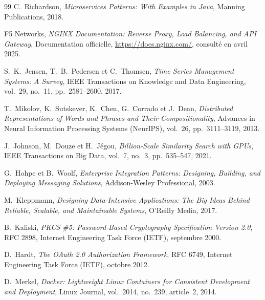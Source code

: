 \begin{thebibliography}{99}
C.~Richardson,
\textit{Microservices Patterns: With Examples in Java},
Manning Publications, 2018.

F5 Networks,
\textit{NGINX Documentation: Reverse Proxy, Load Balancing, and API Gateway},
Documentation officielle, \url{https://docs.nginx.com/}, consulté en avril 2025.


S.~K.~Jensen, T.~B.~Pedersen et C.~Thomsen,
\textit{Time Series Management Systems: A Survey},
IEEE Transactions on Knowledge and Data Engineering, vol.~29, no.~11, pp.~2581--2600, 2017.


T.~Mikolov, K.~Sutskever, K.~Chen, G.~Corrado et J.~Dean,
\textit{Distributed Representations of Words and Phrases and Their Compositionality},
Advances in Neural Information Processing Systems (NeurIPS), vol.~26, pp.~3111--3119, 2013.

J.~Johnson, M.~Douze et H.~Jégou,
\textit{Billion-Scale Similarity Search with GPUs},
IEEE Transactions on Big Data, vol.~7, no.~3, pp.~535--547, 2021.


G.~Hohpe et B.~Woolf,
\textit{Enterprise Integration Patterns: Designing, Building, and Deploying Messaging Solutions},
Addison-Wesley Professional, 2003.

M.~Kleppmann,
\textit{Designing Data-Intensive Applications: The Big Ideas Behind Reliable, Scalable, and Maintainable Systems},
O'Reilly Media, 2017.


B.~Kaliski,
\textit{PKCS \#5: Password-Based Cryptography Specification Version 2.0},
RFC 2898, Internet Engineering Task Force (IETF), septembre 2000.

D.~Hardt,
\textit{The OAuth 2.0 Authorization Framework},
RFC 6749, Internet Engineering Task Force (IETF), octobre 2012.


D.~Merkel,
\textit{Docker: Lightweight Linux Containers for Consistent Development and Deployment},
Linux Journal, vol.~2014, no.~239, article~2, 2014.


\end{thebibliography}
